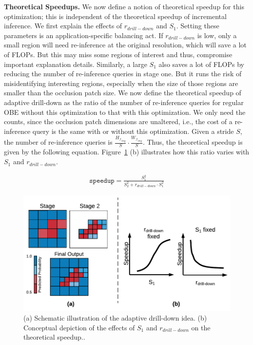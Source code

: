 \vspace{2mm}
\noindent \textbf{Theoretical Speedups.}
We now define a notion of theoretical speedup for this optimization; this is independent of the theoretical speedup of incremental inference. We first explain the effects of $r_{drill-down}$ and $S_1$. Setting these parameters is an application-specific balancing act. If $r_{drill-down}$ is low, only a small region will need re-inference at the original resolution, which will save a lot of FLOPs. But this may miss some regions of interest and thus, compromise important explanation details. Similarly, a large $S_1$ also saves a lot of FLOPs by reducing the number of re-inference queries in stage one. But it runs the risk of misidentifying interesting regions, especially when the size of those regions are smaller than the occlusion patch size. We now define the theoretical speedup of adaptive drill-down as the ratio of the number of re-inference queries for regular OBE without this optimization to that with this optimization. We only need the counts, since the occlusion patch dimensions are unaltered, i.e., the cost of a re-inference query is the same with or without this optimization. Given a stride $S$, the number of re-inference queries is $\frac{H_{\mathcal{I}_{img}}}{S} \cdot \frac{W_{\mathcal{I}_{img}}}{S}$. Thus, the theoretical speedup is given by the following equation. Figure~\ref{fig:adaptive_drill_down} (b) illustrates how this ratio varies with $S_1$ and $r_{drill-down}$.

\vspace{-2mm}
\begin{align}
\label{eqn:adaptive-drill-down-eqn}
\texttt{speedup} = \frac{S^2_1}{S^2_2+r_{drill-down} \cdot S^2_1}
\end{align}

\begin{figure}[t]
\includegraphics[width=\columnwidth]{images/adaptive_drill_down}
\caption{(a) Schematic illustration of the adaptive drill-down idea. (b) Conceptual depiction of the effects of $S_1$ and $r_{drill-down}$ on the theoretical speedup.. }
\label{fig:adaptive_drill_down}
\vspace{-4mm}
\end{figure}

